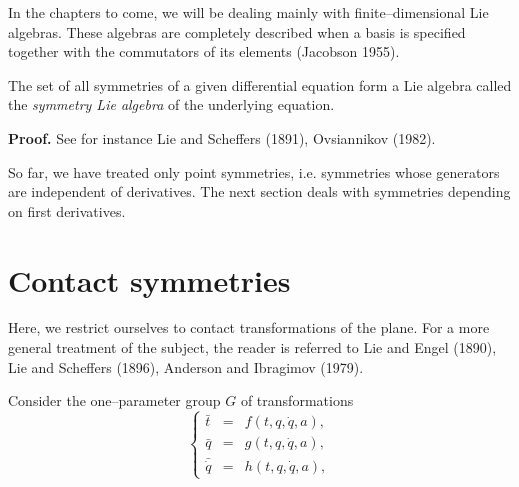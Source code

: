 In the chapters to come, we will be dealing mainly with finite--dimensional Lie
algebras. These algebras are completely described when a basis is specified
together with the commutators of its elements (Jacobson  1955).
\begin{theo}
\begin{em}
The set of all symmetries of a given differential equation form a Lie algebra
called the {\em symmetry Lie algebra} of the underlying equation.
\end{em}
\end{theo}
{\bf Proof.} See for instance Lie and Scheffers (1891), Ovsiannikov (1982).

So far, we have treated only point symmetries, i.e. symmetries whose generators
are independent of derivatives. The next section deals with symmetries
depending on first derivatives.
\section{Contact symmetries}
Here, we restrict ourselves to contact transformations of the plane. For a more
general treatment of the subject, the reader is referred to
Lie and Engel (1890), Lie and Scheffers (1896), Anderson and Ibragimov (1979).

Consider the one--parameter group $G$ of transformations
\begin{equation}
\label{ch1:s11}
\left \{ \begin{array}{lll}
\bar t & = & f(t,q,\dot q,a),\\
\bar q & = & g(t,q,\dot q,a),\\
\bar{\dot q} & = & h(t,q,\dot q,a),
\end{array}
\right.
\end{equation}


